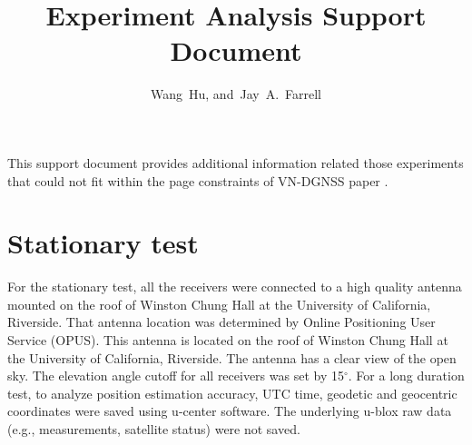 \documentclass[letterpaper, 10 pt,onecolumn]{article}
\begin{document}
	\title{Experiment Analysis Support Document}
	\author{Wang~Hu,
		and~Jay~A.~Farrell
	}
	\maketitle
	
	This support document provides additional information related those experiments that could not fit within the page constraints of VN-DGNSS paper \cite{hu2021using}.
	
	\section{Stationary test}
	For the stationary test, all the receivers were connected to a high quality antenna mounted on the roof of Winston Chung Hall at the University of California, Riverside. That antenna location was determined by Online Positioning User Service (OPUS). This antenna is located on the roof of Winston Chung Hall at the University of California, Riverside. The antenna has a clear view of the open sky. The elevation angle cutoff for all receivers was set by 15$^\circ$. For a long duration test, to analyze position estimation accuracy, UTC time, geodetic and geocentric coordinates were saved using u-center software. The underlying u-blox raw data (e.g., measurements, satellite status) were not saved.
	
\end{document}
